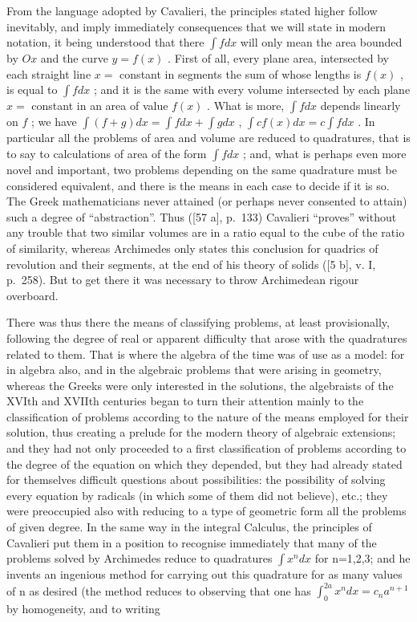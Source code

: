 From the language adopted by Cavalieri, the principles stated higher follow inevitably, and imply immediately consequences that we will state in modern notation, it being understood that there \(\int f dx\) will only mean the area bounded by \(Ox\) and the curve \(y = f(x)\) . First of all, every plane area, intersected by each straight line \(x =\) constant in segments the sum of whose lengths is \(f(x)\) , is equal to \(\int f dx\) ; and it is the same with every volume intersected by each plane \(x =\) constant in an area of value \(f(x)\) . What is more, \(\int f dx\) depends linearly on \(f\) ; we have \(\int (f + g)dx = \int f dx + \int g dx\) , \(\int cf(x)dx = c\int f dx\) . In particular all the problems of area and volume are reduced to quadratures, that is to say to calculations of area of the form \(\int f dx\) ; and, what is perhaps even more novel and important, two problems depending on the same quadrature must be considered equivalent, and there is the means in each case to decide if it is so. The Greek mathematicians never attained (or perhaps never consented to attain) such a degree of ``abstraction''. Thus ({[}57 a{]}, p.~133) Cavalieri ``proves'' without any trouble that two similar volumes are in a ratio equal to the cube of the ratio of similarity, whereas Archimedes only states this conclusion for quadrics of revolution and their segments, at the end of his theory of solids ({[}5 b{]}, v. I, p.~258). But to get there it was necessary to throw Archimedean rigour overboard.

There was thus there the means of classifying problems, at least provisionally, following the degree of real or apparent difficulty that arose with the quadratures related to them. That is where the algebra of the time was of use as a model: for in algebra also, and in the algebraic problems that were arising in geometry, whereas the Greeks were only interested in the solutions, the algebraists of the XVIth and XVIIth centuries began to turn their attention mainly to the classification of problems according to the nature of the means employed for their solution, thus creating a prelude for the modern theory of algebraic extensions; and they had not only proceeded to a first classification of problems according to the degree of the equation on which they depended, but they had already stated for themselves difficult questions about possibilities: the possibility of solving every equation by radicals (in which some of them did not believe), etc.; they were preoccupied also with reducing to a type of geometric form all the problems of given degree. In the same way in the integral Calculus, the principles of Cavalieri put them in a position to recognise immediately that many of the problems solved by Archimedes reduce to quadratures \(\int x^{n}dx\) for n=1,2,3; and he invents an ingenious method for carrying out this quadrature for as many values of n as desired (the method reduces to observing that one has \(\int_{0}^{2a}x^{n}dx=c_{n}a^{n+1}\) by homogeneity, and to writing

